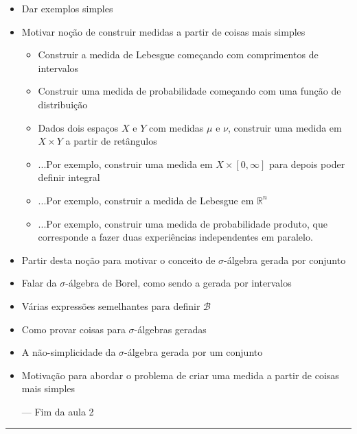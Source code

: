 \documentclass{article}
\newcommand{\R}{\mathbb{R}}
\begin{document}
\begin{itemize}
\item Dar exemplos simples
\item Motivar noção de construir medidas a partir de coisas mais simples
\begin{itemize}
\item Construir a medida de Lebesgue começando com comprimentos de intervalos
\item Construir uma medida de probabilidade começando com uma função de distribuição
\item Dados dois espaços $X$ e $Y$ com medidas $\mu$ e $\nu$, construir uma medida em $X \times Y$ a partir de retângulos
\item ...Por exemplo, construir uma medida em $X \times \left[0,\infty\right]$ para depois poder definir integral
\item ...Por exemplo, construir a medida de Lebesgue em $\R^n$
\item ...Por exemplo, construir uma medida de probabilidade produto, que corresponde a fazer duas experiências independentes em paralelo.
\end{itemize}
\item Partir desta noção para motivar o conceito de $\sigma$-álgebra gerada por conjunto
\item Falar da $\sigma$-álgebra de Borel, como sendo a gerada por intervalos
\item Várias expressões semelhantes para definir $\mathcal{B}$
\item Como provar coisas para $\sigma$-álgebras geradas
\item A não-simplicidade da $\sigma$-álgebra gerada por um conjunto
\item Motivação para abordar o problema de criar uma medida a partir de coisas mais simples
\item[---] Fim da aula 2
\end{itemize}
\hrule
\end{document}
